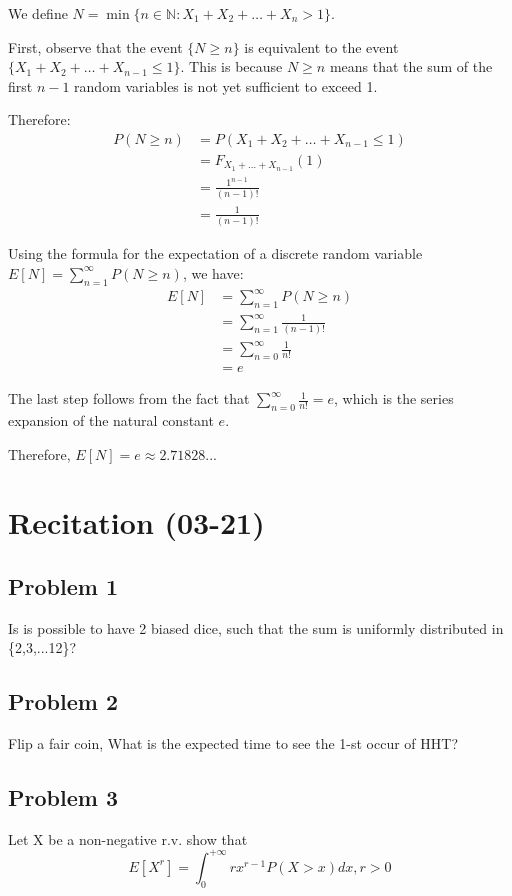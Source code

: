     \begin{solution}
        We define $N = \min\{n \in \mathbb{N}: X_1 + X_2 + \ldots + X_n > 1\}$.

First, observe that the event $\{N \geq n\}$ is equivalent to the event $\{X_1 + X_2 + \ldots + X_{n-1} \leq 1\}$. This is because $N \geq n$ means that the sum of the first $n-1$ random variables is not yet sufficient to exceed 1.

Therefore:
\begin{align*}
P(N \geq n) &= P(X_1 + X_2 + \ldots + X_{n-1} \leq 1)\\
&= F_{X_1+\ldots+X_{n-1}}(1)\\
&= \frac{1^{n-1}}{(n-1)!}\\
&= \frac{1}{(n-1)!}
\end{align*}

Using the formula for the expectation of a discrete random variable $E[N] = \sum_{n=1}^{\infty} P(N \geq n)$, we have:
\begin{align*}
E[N] &= \sum_{n=1}^{\infty} P(N \geq n)\\
&= \sum_{n=1}^{\infty} \frac{1}{(n-1)!}\\
&= \sum_{n=0}^{\infty} \frac{1}{n!}\\
&= e
\end{align*}

The last step follows from the fact that $\sum_{n=0}^{\infty} \frac{1}{n!} = e$, which is the series expansion of the natural constant $e$.

Therefore, $E[N] = e \approx 2.71828...$

    \end{solution}
\section{Recitation (03-21)}
\subsection*{Problem 1}
Is is possible to have 2 biased dice, such that the sum is uniformly distributed in \{2,3,...12\}?
\subsection*{Problem 2}
Flip a fair coin, What is the expected time to see the 1-st occur of HHT?
\subsection*{Problem 3}
Let X be a non-negative r.v. show that$$
    E[X^r]=\int_{0}^{+\infty}rx^{r-1}P(X>x)dx,r>0
$$ 
